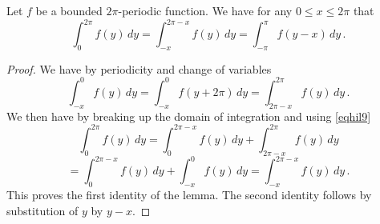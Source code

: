 \begin{lemma}\label{periodic-domain-shift}
\leanok
Let $f$ be a bounded $2\pi$-periodic function. We have for any
$0 \le x\le 2\pi$ that
\begin{equation}
 \int_0^{2\pi} f(y)\, dy= \int_{-x}^{2\pi -x} f(y)\, dy
 =\int_{-\pi}^{\pi} f(y-x)\, dy\,.
\end{equation}
\end{lemma}
\begin{proof}
\leanok
    We have by periodicity and change of variables
    \begin{equation}\label{eqhil9}
 \int_{-x}^{0} f(y)\, dy=\int_{-x}^{0} f(y+2\pi)\, dy= \int_{2\pi -x}^{2\pi} f(y)\, dy\, .
\end{equation}
We then have by breaking up the domain of integration
and using \eqref{eqhil9}
\begin{equation*}
 \int_0^{2\pi} f(y)\, dy= \int_0^{2\pi -x} f(y)\, dy+
 \int_{2\pi -x}^{2\pi} f(y)\, dy
 \end{equation*}
\begin{equation}
= \int_0^{2\pi -x} f(y)\, dy+
 \int_{ -x}^{0} f(y)\, dy
 = \int_{-x}^{2\pi-x} f(y)\, dy\, .
 \end{equation}
This proves the first identity of the lemma. The second identity follows by substitution of $y$ by $y-x$.
\end{proof}



